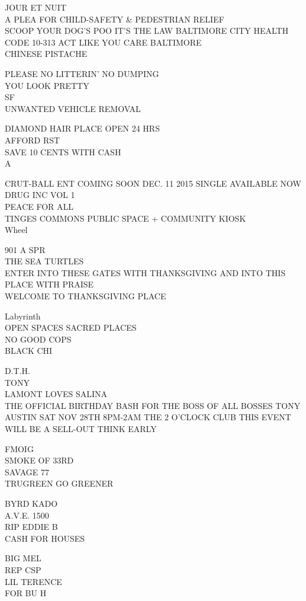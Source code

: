 \documentclass[10pt,letterpaper]{article}
\begin{document}
JOUR ET NUIT\\
A PLEA FOR CHILD{-}SAFETY \& PEDESTRIAN RELIEF\\
SCOOP YOUR DOG'S POO IT'S THE LAW BALTIMORE CITY HEALTH CODE 10{-}313 ACT LIKE YOU CARE BALTIMORE\\
CHINESE PISTACHE

PLEASE NO LITTERIN' NO DUMPING\\
YOU LOOK PRETTY\\
SF\\
UNWANTED VEHICLE REMOVAL

DIAMOND HAIR PLACE OPEN 24 HRS\\
AFFORD RST\\
SAVE 10 CENTS WITH CASH\\
A

CRUT{-}BALL ENT COMING SOON DEC. 11 2015 SINGLE AVAILABLE NOW DRUG INC VOL 1\\
PEACE FOR ALL\\
TINGES COMMONS PUBLIC SPACE + COMMUNITY KIOSK\\
Wheel

901 A SPR\\
THE SEA TURTLES\\
ENTER INTO THESE GATES WITH THANKSGIVING AND INTO THIS PLACE WITH PRAISE\\
WELCOME TO THANKSGIVING PLACE

Labyrinth\\
OPEN SPACES SACRED PLACES\\
NO GOOD COPS\\
BLACK CHI

D.T.H.\\
TONY\\
LAMONT LOVES SALINA\\
THE OFFICIAL BIRTHDAY BASH FOR THE BOSS OF ALL BOSSES TONY AUSTIN SAT NOV 28TH 8PM{-}2AM THE 2 O'CLOCK CLUB THIS EVENT WILL BE A SELL{-}OUT THINK EARLY

FMOIG\\
SMOKE OF 33RD\\
SAVAGE 77\\
TRUGREEN GO GREENER

BYRD KADO\\
A.V.E. 1500\\
RIP EDDIE B\\
CASH FOR HOUSES

BIG MEL\\
REP CSP\\
LIL TERENCE\\
FOR BU H
\end{document}
